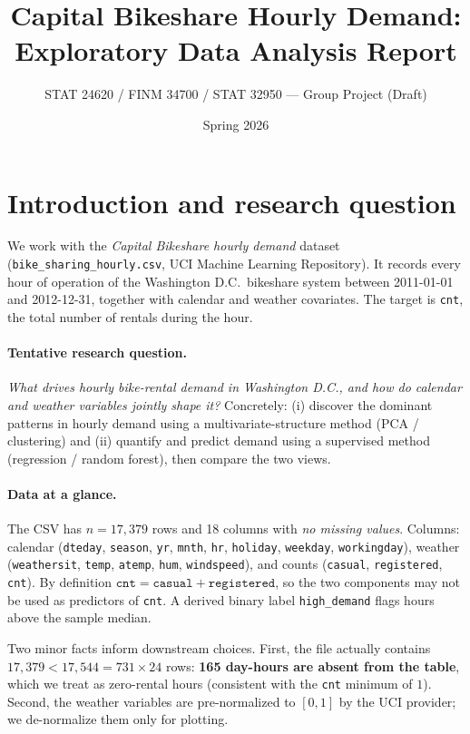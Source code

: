 \documentclass[11pt]{article}
\title{Capital Bikeshare Hourly Demand:\\
       Exploratory Data Analysis Report}
\author{STAT 24620 / FINM 34700 / STAT 32950 --- Group Project (Draft)}
\date{Spring 2026}
\begin{document}
\maketitle

\section{Introduction and research question}

We work with the \emph{Capital Bikeshare hourly demand} dataset
(\texttt{bike\_sharing\_hourly.csv}, UCI Machine Learning Repository).
It records every hour of operation of the Washington D.C.\ bikeshare
system between 2011-01-01 and 2012-12-31, together with calendar and
weather covariates. The target is \texttt{cnt}, the total number of
rentals during the hour.

\paragraph{Tentative research question.}
\emph{What drives hourly bike-rental demand in Washington D.C., and how
do calendar and weather variables jointly shape it?} Concretely:
(i) discover the dominant patterns in hourly demand using a
multivariate-structure method (PCA / clustering) and (ii) quantify and
predict demand using a supervised method (regression / random forest),
then compare the two views.

\paragraph{Data at a glance.}
The CSV has $n = 17{,}379$ rows and 18 columns with \emph{no missing
values}. Columns: calendar (\texttt{dteday}, \texttt{season},
\texttt{yr}, \texttt{mnth}, \texttt{hr}, \texttt{holiday},
\texttt{weekday}, \texttt{workingday}), weather (\texttt{weathersit},
\texttt{temp}, \texttt{atemp}, \texttt{hum}, \texttt{windspeed}), and
counts (\texttt{casual}, \texttt{registered}, \texttt{cnt}). By
definition $\texttt{cnt}=\texttt{casual}+\texttt{registered}$, so the
two components may not be used as predictors of \texttt{cnt}. A derived
binary label \texttt{high\_demand} flags hours above the sample median.

Two minor facts inform downstream choices. First, the file actually
contains $17{,}379 < 17{,}544 = 731 \times 24$ rows: \textbf{165
day-hours are absent from the table}, which we treat as zero-rental
hours (consistent with the \texttt{cnt} minimum of $1$). Second, the
weather variables are pre-normalized to $[0,1]$ by the UCI provider; we
de-normalize them only for plotting.
\end{document}
